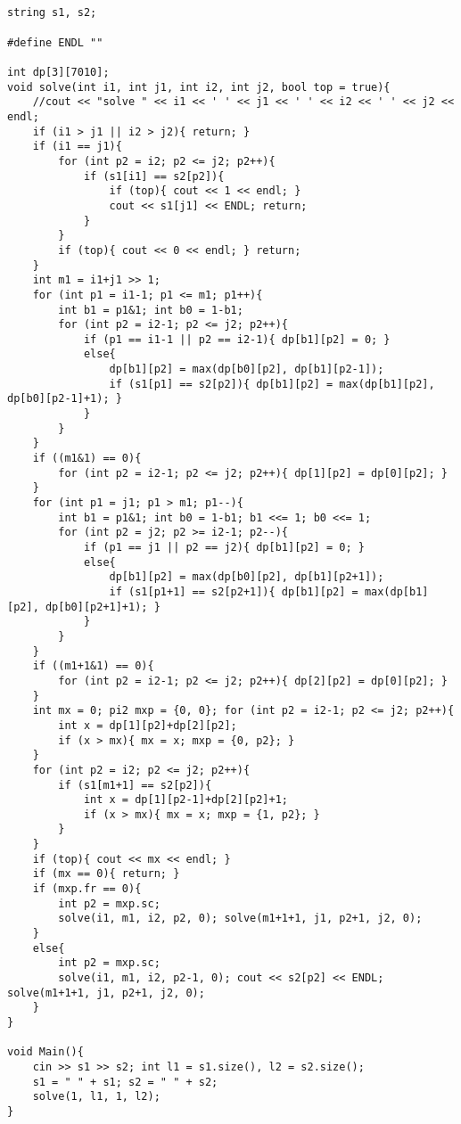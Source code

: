 \documentclass[landscape, 8pt, a4paper, oneside, twocolumn]{extarticle}
\begin{document}
\subsection{}
\begin{verbatim}
string s1, s2;

#define ENDL ""

int dp[3][7010];
void solve(int i1, int j1, int i2, int j2, bool top = true){
    //cout << "solve " << i1 << ' ' << j1 << ' ' << i2 << ' ' << j2 << endl;
    if (i1 > j1 || i2 > j2){ return; }
    if (i1 == j1){
        for (int p2 = i2; p2 <= j2; p2++){
            if (s1[i1] == s2[p2]){
                if (top){ cout << 1 << endl; }
                cout << s1[j1] << ENDL; return;
            }
        }
        if (top){ cout << 0 << endl; } return;
    }
    int m1 = i1+j1 >> 1;
    for (int p1 = i1-1; p1 <= m1; p1++){
        int b1 = p1&1; int b0 = 1-b1;
        for (int p2 = i2-1; p2 <= j2; p2++){
            if (p1 == i1-1 || p2 == i2-1){ dp[b1][p2] = 0; }
            else{
                dp[b1][p2] = max(dp[b0][p2], dp[b1][p2-1]);
                if (s1[p1] == s2[p2]){ dp[b1][p2] = max(dp[b1][p2], dp[b0][p2-1]+1); }
            }
        }
    }
    if ((m1&1) == 0){
        for (int p2 = i2-1; p2 <= j2; p2++){ dp[1][p2] = dp[0][p2]; }
    }
    for (int p1 = j1; p1 > m1; p1--){
        int b1 = p1&1; int b0 = 1-b1; b1 <<= 1; b0 <<= 1;
        for (int p2 = j2; p2 >= i2-1; p2--){
            if (p1 == j1 || p2 == j2){ dp[b1][p2] = 0; }
            else{
                dp[b1][p2] = max(dp[b0][p2], dp[b1][p2+1]);
                if (s1[p1+1] == s2[p2+1]){ dp[b1][p2] = max(dp[b1][p2], dp[b0][p2+1]+1); }
            }
        }
    }
    if ((m1+1&1) == 0){
        for (int p2 = i2-1; p2 <= j2; p2++){ dp[2][p2] = dp[0][p2]; }
    }
    int mx = 0; pi2 mxp = {0, 0}; for (int p2 = i2-1; p2 <= j2; p2++){
        int x = dp[1][p2]+dp[2][p2];
        if (x > mx){ mx = x; mxp = {0, p2}; }
    }
    for (int p2 = i2; p2 <= j2; p2++){
        if (s1[m1+1] == s2[p2]){
            int x = dp[1][p2-1]+dp[2][p2]+1;
            if (x > mx){ mx = x; mxp = {1, p2}; }
        }
    }
    if (top){ cout << mx << endl; }
    if (mx == 0){ return; }
    if (mxp.fr == 0){
        int p2 = mxp.sc;
        solve(i1, m1, i2, p2, 0); solve(m1+1+1, j1, p2+1, j2, 0);
    }
    else{
        int p2 = mxp.sc;
        solve(i1, m1, i2, p2-1, 0); cout << s2[p2] << ENDL; solve(m1+1+1, j1, p2+1, j2, 0);
    }
}

void Main(){
    cin >> s1 >> s2; int l1 = s1.size(), l2 = s2.size();
    s1 = " " + s1; s2 = " " + s2;
    solve(1, l1, 1, l2);
}
\end{verbatim}
\end{document}
